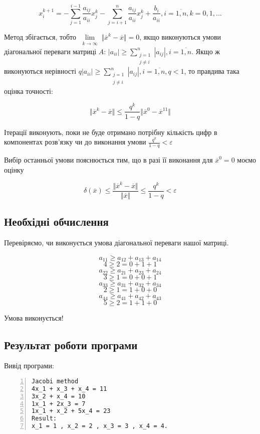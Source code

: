 \documentclass[a4paper, 12pt]{article}
\begin{document}
\[
x_{i}^{k+1} = - \sum_{j=1}^{i-1} \frac{a_{ij}}{a_{ii}}x_j^k - \sum_{j=i+1}^{n} \frac{a_{ij}}{a_{ii}}x_j^k + \frac{b_i}{a_{ii}}, i = \overline{1, n}, k = 0, 1, ...
\]

Метод збігається, тобто $\lim\limits_{\substack{k \to \infty}} \Vert \overline{x}^k - \overline{x}\Vert = 0$, якщо виконуються умови діагональної переваги матриці $A$:  $|a_{ii}| \geqslant \sum\limits_{\substack{j = 1 \\ j \neq i}}^{n}|a_{ij}|, i = \overline{1, n}$. Якщо ж виконуються нерівності $q|a_{ii}| \geqslant \sum\limits_{\substack{j = 1 \\ j \neq i}}^{n}|a_{ij}|, i = \overline{1, n}, q < 1$, то правдива така оцінка точності:

\[
\Vert \overline{x}^k - \overline{x}\Vert \leqslant \frac{q^k}{1-q}\Vert \overline{x}^0 - \overline{x}^11\Vert
\]

Ітерації виконують, поки не буде отримано потрібну кількість цифр в компонентах розв'язку чи до виконання умови $\frac{q^k}{1-q} < \varepsilon$

Вибір останньої умови пояснюється тим, що в разі її виконання для $\overline{x}^0 = 0$ моємо оцінку

\[
\delta(\overline{x}) \leqslant \frac{\Vert\overline{x}^k - \overline{x}\Vert}{\Vert\overline{x}\Vert}  \leqslant \frac{q^k}{1-q} < \varepsilon
\]

\subsection{Необхідні обчислення}

Перевіряємо, чи виконується умова діагональної переваги нашої матриці.

\[ a_{11} \geqslant a_{12} + a_{13} + a_{14}\]
\[ 4 \geqslant 2 = 0 + 1 + 1\]
\[ a_{22} \geqslant a_{21} + a_{23} + a_{24}\]
\[ 3 \geqslant 1 = 0 + 0 + 1\]
\[ a_{33} \geqslant a_{31} + a_{32} + a_{34}\]
\[ 2 \geqslant 1 = 1 + 0 + 0\]
\[ a_{44} \geqslant a_{41} + a_{42} + a_{43}\]
\[ 5 \geqslant 2 = 1 + 1 + 0\]

Умова виконується!

\subsection{Результат роботи програми}

Вивід програми:

\begin{Verbatim}[numbers=left,xleftmargin=20mm]
Jacobi method
4x_1 + x_3 + x_4 = 11
3x_2 + x_4 = 10
1x_1 + 2x_3 = 7
1x_1 + x_2 + 5x_4 = 23
Result:
x_1 = 1 , x_2 = 2 , x_3 = 3 , x_4 = 4.
\end{Verbatim}
\end{document}
